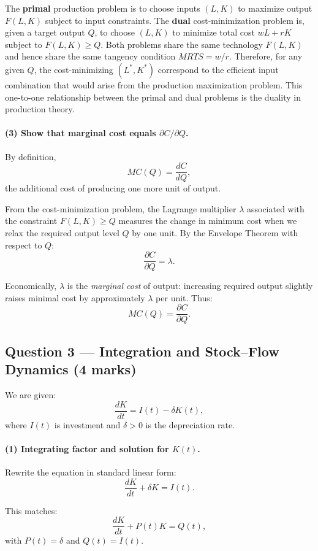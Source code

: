 \documentclass[12pt]{article}
\begin{document}
The \textbf{primal} production problem is to choose inputs $(L,K)$ to maximize output $F(L,K)$ subject to input constraints. The \textbf{dual} cost-minimization problem is, given a target output $Q$, to choose $(L,K)$ to minimize total cost $wL + rK$ subject to $F(L,K) \ge Q$. Both problems share the same technology $F(L,K)$ and hence share the same tangency condition $MRTS = w/r$. Therefore, for any given $Q$, the cost-minimizing $(L^*,K^*)$ correspond to the efficient input combination that would arise from the production maximization problem. This one-to-one relationship between the primal and dual problems is the duality in production theory.

\paragraph{(3) Show that marginal cost equals $\partial C/\partial Q$.}

By definition,
\[
MC(Q) = \frac{dC}{dQ},
\]
the additional cost of producing one more unit of output.

From the cost-minimization problem, the Lagrange multiplier $\lambda$ associated with the constraint $F(L,K)\ge Q$ measures the change in minimum cost when we relax the required output level $Q$ by one unit. By the Envelope Theorem with respect to $Q$:
\[
\frac{\partial C}{\partial Q} = \lambda.
\]

Economically, $\lambda$ is the \emph{marginal cost} of output: increasing required output slightly raises minimal cost by approximately $\lambda$ per unit. Thus:
\[
\boxed{MC(Q) = \frac{\partial C}{\partial Q}.}
\]

\subsection*{Question 3 — Integration and Stock–Flow Dynamics (4 marks)}

We are given:
\[
\frac{dK}{dt} = I(t) - \delta K(t),
\]
where $I(t)$ is investment and $\delta > 0$ is the depreciation rate.

\paragraph{(1) Integrating factor and solution for $K(t)$.}

Rewrite the equation in standard linear form:
\[
\frac{dK}{dt} + \delta K = I(t).
\]

This matches:
\[
\frac{dK}{dt} + P(t)K = Q(t),
\]
with $P(t)=\delta$ and $Q(t) = I(t)$.
\end{document}
